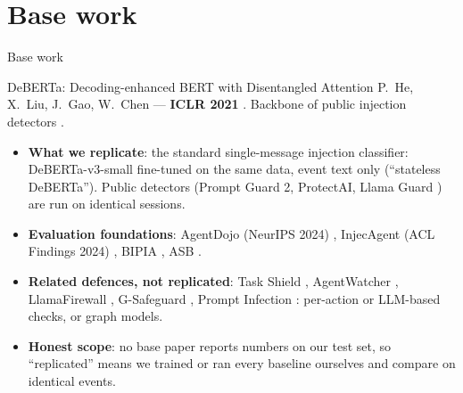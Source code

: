\documentclass[aspectratio=169,10pt]{beamer}
\begin{document}
\section{Base work}
\begin{frame}{Base work}
  \begin{block}{DeBERTa: Decoding-enhanced BERT with Disentangled Attention}
    P.~He, X.~Liu, J.~Gao, W.~Chen --- \textbf{ICLR 2021} \cite{he2021}. Backbone of public injection detectors \cite{protectai2024,promptguard2025}.
  \end{block}
  \begin{itemize}
    \item \textbf{What we replicate}: the standard single-message injection classifier: DeBERTa-v3-small fine-tuned on the same data, event text only (``stateless DeBERTa''). Public detectors (Prompt Guard 2, ProtectAI, Llama Guard \cite{inan2023}) are run on identical sessions.
    \item \textbf{Evaluation foundations}: AgentDojo (NeurIPS 2024) \cite{debenedetti2024}, InjecAgent (ACL Findings 2024) \cite{zhan2024}, BIPIA \cite{yi2023}, ASB \cite{zhang2024asb}.
    \item \textbf{Related defences, not replicated}: Task Shield \cite{jia2024}, AgentWatcher \cite{wang2026}, LlamaFirewall \cite{llamafirewall2025}, G-Safeguard \cite{gsafeguard2025}, Prompt Infection \cite{lee2024}: per-action or LLM-based checks, or graph models.
    \item \textbf{Honest scope}: no base paper reports numbers on our test set, so ``replicated'' means we trained or ran every baseline ourselves and compare on identical events.
  \end{itemize}
\end{frame}
\end{document}
